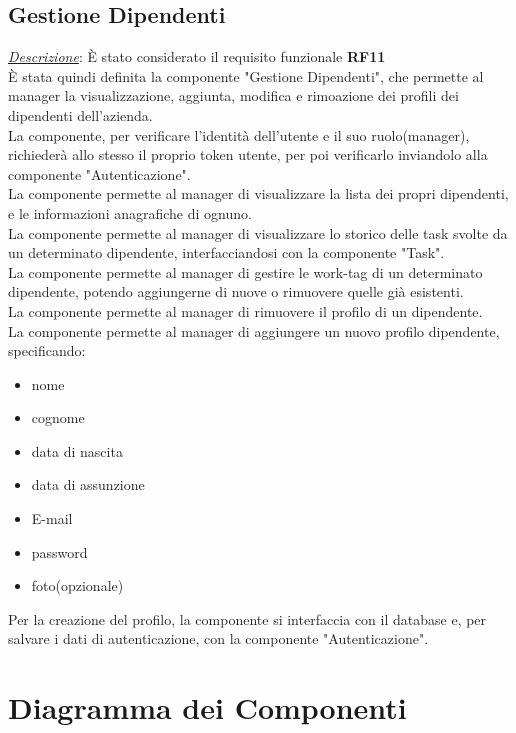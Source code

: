 \documentclass{report}
\begin{document}
\subsection*{Gestione Dipendenti}
\uline{\textit{Descrizione}}:
È stato considerato il requisito funzionale \textbf{RF11}\\
È stata quindi definita la componente "Gestione Dipendenti", che permette al manager la visualizzazione, aggiunta, modifica e rimoazione dei profili dei dipendenti dell'azienda.\\
La componente, per verificare l'identità dell'utente e il suo ruolo(manager), richiederà allo stesso il proprio token utente, per poi verificarlo inviandolo alla componente "Autenticazione".\\
La componente permette al manager di visualizzare la lista dei propri dipendenti, e le informazioni anagrafiche di ognuno.\\
La componente permette al manager di visualizzare lo storico delle task svolte da un determinato dipendente, interfacciandosi con la componente "Task".\\
La componente permette al manager di gestire le work-tag di un determinato dipendente, potendo aggiungerne di nuove o rimuovere quelle già esistenti.\\
La componente permette al manager di rimuovere il profilo di un dipendente.\\
La componente permette al manager di aggiungere un nuovo profilo dipendente, specificando:
\begin{itemize}
	\item nome
	\item cognome
	\item data di nascita
	\item data di assunzione
	\item E-mail
	\item password
	\item foto(opzionale)
\end{itemize}
Per la creazione del profilo, la componente si interfaccia con il database e, per salvare i dati di autenticazione, con la componente "Autenticazione".

\section{Diagramma dei Componenti}
\end{document}
